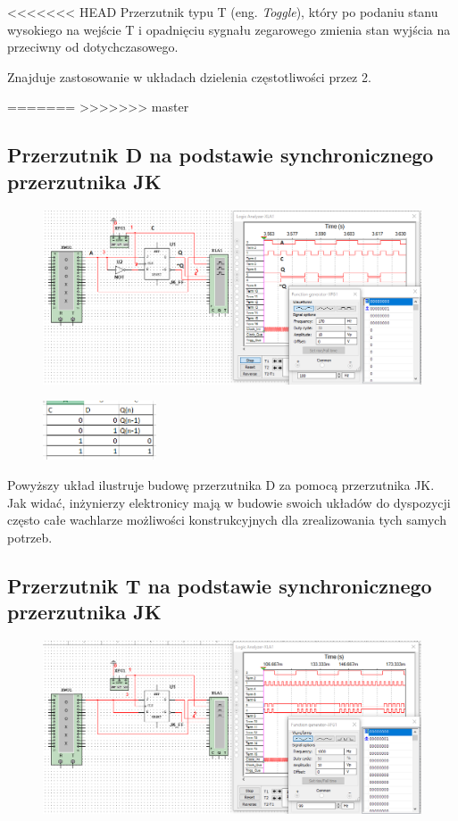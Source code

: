 \documentclass[12pt,a4paper]{article}
\begin{document}
<<<<<<< HEAD
Przerzutnik typu T (eng. \textit{Toggle}), który po podaniu stanu wysokiego na wejście T i opadnięciu sygnału zegarowego zmienia stan wyjścia na przeciwny od dotychczasowego.

Znajduje zastosowanie w układach dzielenia częstotliwości przez 2.

=======
>>>>>>> master
\subsection{Przerzutnik D na podstawie synchronicznego przerzutnika JK}
\begin{figure}[H]
\centering
\includegraphics[width=\textwidth]{img/3f}
\end{figure}
\begin{figure}[H]
\centering
\includegraphics[width=0.3\textwidth]{img/3dTruthTable}
\end{figure}

Powyższy układ ilustruje budowę przerzutnika D za pomocą przerzutnika JK. Jak widać, inżynierzy elektronicy mają w budowie swoich układów do dyspozycji często całe wachlarze możliwości konstrukcyjnych dla zrealizowania tych samych potrzeb.


\subsection{Przerzutnik T na podstawie synchronicznego przerzutnika JK}
\begin{figure}[H]
\centering
\includegraphics[width=\textwidth]{img/3g}
\end{figure}
\end{document}
